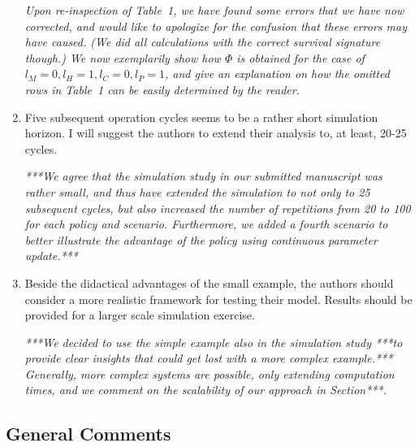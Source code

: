 \documentclass[authoryear]{elsarticle}
\begin{document}
\begin{enumerate}
\emph{Upon re-inspection of Table~1, we have found some errors that we have now corrected,
and would like to apologize for the confusion that these errors may have caused.
(We did all calculations with the correct survival signature though.)
We now exemplarily show how $\Phi$ is obtained for the case of $l_M = 0, l_H = 1, l_C = 0, l_P = 1$,
and give an explanation on how the omitted rows in Table~1 can be easily determined by the reader.}

\item Five subsequent operation cycles seems to be a rather short simulation horizon. I will suggest the authors to extend their analysis to, at least, 20-25 cycles.

\smallskip

\emph{***We agree that the simulation study in our submitted manuscript was rather small,
and thus have extended the simulation to not only to 25 subsequent cycles,
but also increased the number of repetitions from 20 to 100 for each policy and scenario.
Furthermore, we added a fourth scenario to better illustrate the advantage of the policy
using continuous parameter update.***}

\item Beside the didactical advantages of the small example, the authors should consider a more realistic framework for testing their model. Results should be provided for a larger scale simulation exercise.

\smallskip

\emph{***We decided to use the simple example also in the simulation study ***to provide clear insights
that could get lost with a more complex example.***
Generally, more complex systems are possible, only extending computation times,
and we comment on the scalability of our approach in Section***.}
\end{enumerate}


\subsection*{General Comments}
\end{document}
